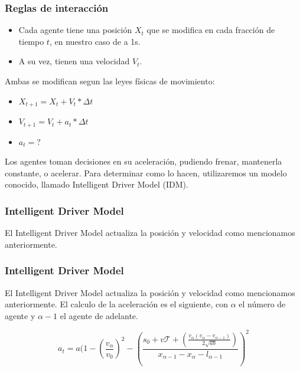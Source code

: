 \documentclass[10pt, compress]{beamer}
\begin{document}
\begin{frame}[fragile]

\frametitle{Reglas de interacci\'on}
\begin{itemize}
\item Cada agente tiene una posici\'on $X_t$ que se modifica en cada fracci\'on de tiempo $t$, en nuestro caso de a 1s.
\item A su vez, tienen una velocidad $V_t$.
\end{itemize}
Ambas se modifican segun las leyes f\'isicas de movimiento:
\begin{itemize}
\item $X_{t+1} = X_t + V_t * \Delta t$
\item $V_{t+1} = V_t + a_t * \Delta t$
\item $a_t = ?$ 
\end{itemize}

Los agentes toman decisiones en su aceleraci\'on, pudiendo frenar, mantenerla constante, o acelerar. Para determinar como lo hacen, utilizaremos un modelo conocido, llamado Intelligent Driver Model (IDM). \supercite{1}
\addtocounter{framenumber}{-1}
\end{frame}

\begin{frame}[fragile]

\frametitle{Intelligent Driver Model}
El Intelligent Driver Model actualiza la posici\'on y velocidad como mencionamos anteriormente.

\end{frame}
\begin{frame}[fragile]

\frametitle{Intelligent Driver Model}
El Intelligent Driver Model actualiza la posici\'on y velocidad como mencionamos anteriormente. El calculo de la aceleraci\'on es el siguiente, con $\alpha$ el n\'umero de agente y $\alpha - 1$ el agente de adelante.

  \begin{equation*}
    a_t = a (1 - (\frac{v_\alpha}{v_0})^2 - (\frac{s_0 + v\mathcal{T} + (\frac{v_\alpha (v_\alpha - v_{\alpha-1})}{2\sqrt{ab}})}{x_{\alpha-1} - x_\alpha - l_{\alpha-1}})^2
  \end{equation*}
\addtocounter{framenumber}{-1}
\end{frame}
\end{document}
